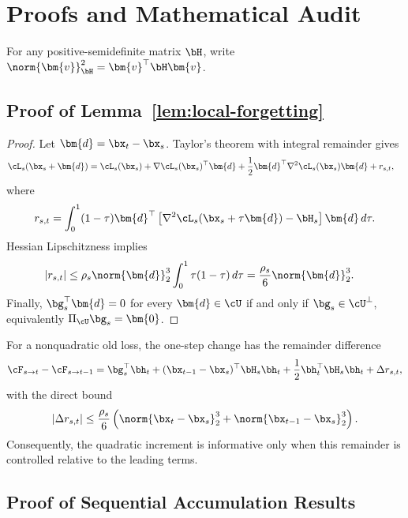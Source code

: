 \section{Proofs and Mathematical Audit}
\label{app:proofs}

For any positive-semidefinite matrix $\bH$, write
$\norm{\bm{v}}_{\bH}^2=\bm{v}^\top\bH\bm{v}$.

\subsection{Proof of Lemma~\ref{lem:local-forgetting}}

\begin{proof}
Let $\bm{d}=\bx_t-\bx_s$. Taylor's theorem with integral remainder gives
\begin{align}
\cL_s(\bx_s+\bm{d})
&=\cL_s(\bx_s)+\nabla\cL_s(\bx_s)^\top\bm{d}
+\frac12\bm{d}^\top\nabla^2\cL_s(\bx_s)\bm{d}+r_{s,t},
\end{align}
where
\begin{equation}
r_{s,t}=\int_0^1(1-\tau)\bm{d}^\top
\left[\nabla^2\cL_s(\bx_s+\tau\bm{d})-\bH_s\right]
\bm{d}\,d\tau.
\end{equation}
Hessian Lipschitzness implies
\begin{align}
|r_{s,t}|
&\leq \rho_s\norm{\bm{d}}_2^3
\int_0^1\tau(1-\tau)\,d\tau
=\frac{\rho_s}{6}\norm{\bm{d}}_2^3.
\end{align}
Finally, $\bg_s^\top\bm{d}=0$ for every $\bm{d}\in\cU$ if and only if
$\bg_s\in\cU^\perp$, equivalently $\Pi_{\cU}\bg_s=\bm{0}$.
\end{proof}

For a nonquadratic old loss, the one-step change has the remainder difference
\begin{equation}
\cF_{s\to t}-\cF_{s\to t-1}
=\bg_s^\top\bh_t
+(\bx_{t-1}-\bx_s)^\top\bH_s\bh_t
+\frac12\bh_t^\top\bH_s\bh_t+\Delta r_{s,t},
\end{equation}
with the direct bound
\begin{equation}
|\Delta r_{s,t}|
\leq\frac{\rho_s}{6}
\left(\norm{\bx_t-\bx_s}_2^3
+\norm{\bx_{t-1}-\bx_s}_2^3\right).
\end{equation}
Consequently, the quadratic increment is informative only when this remainder
is controlled relative to the leading terms.

\subsection{Proof of Sequential Accumulation Results}

